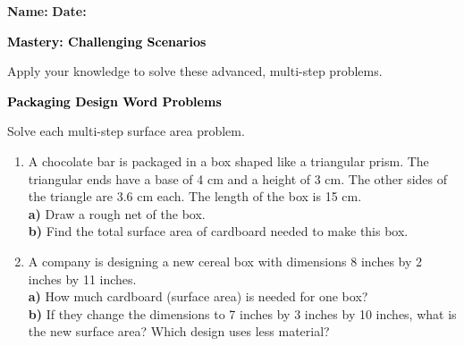 \documentclass[12pt, letterpaper, fleqn]{article}
\newcommand{\blanklong}{\underline{\hspace{6.5cm}}}
\begin{document}
\textbf{Name:} \underline{\hspace{5cm}}
\hfill
\textbf{Date:} \underline{\hspace{3cm}}\\

\begin{tcolorbox}[colback=customteal!20]
    \large\textcolor{black}{\textbf{Mastery: Challenging Scenarios}}
\end{tcolorbox}

\vspace{3mm}
\noindent
Apply your knowledge to solve these advanced, multi-step problems.

\vspace{4mm}

\begin{tcolorbox}[colback=customteal!20]
\large\textcolor{black}{\textbf{Packaging Design Word Problems}}
\end{tcolorbox}

\noindent
Solve each multi-step surface area problem.

\vspace{3mm}
\begin{enumerate}[itemsep=1.5cm, leftmargin=0.6cm]
\item A chocolate bar is packaged in a box shaped like a triangular prism. The triangular ends have a base of 4 cm and a height of 3 cm. The other sides of the triangle are 3.6 cm each. The length of the box is 15 cm. \\
\textbf{a)} Draw a rough net of the box. \\
\textbf{b)} Find the total surface area of cardboard needed to make this box. \blanklong
\vspace{1.5cm}
\item A company is designing a new cereal box with dimensions 8 inches by 2 inches by 11 inches. \\
\textbf{a)} How much cardboard (surface area) is needed for one box? \blanklong \\
\textbf{b)} If they change the dimensions to 7 inches by 3 inches by 10 inches, what is the new surface area? Which design uses less material? \blanklong
\vspace{1.5cm}
\end{enumerate}
\newpage
\end{document}
